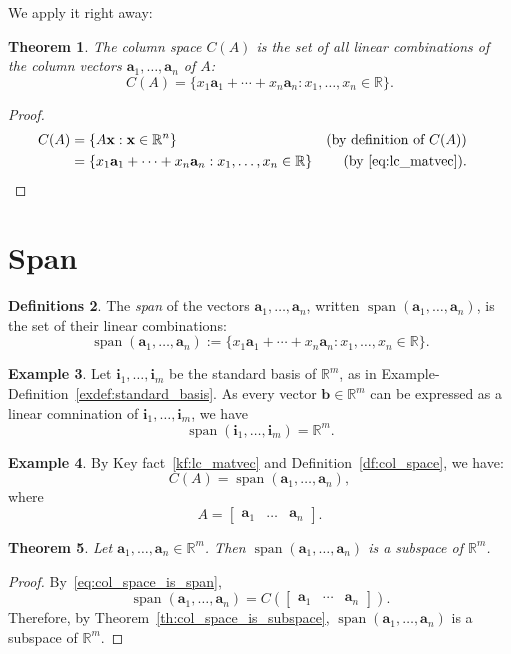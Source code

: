 \documentclass[12pt]{amsart}
\newcommand{\RR}{\mathbb{R}}
\DeclareMathOperator{\Span}{span}
\newtheorem{theorem}{Theorem}[section]
\theoremstyle{definition} \newtheorem{definition}[theorem]{Definition}
\newtheorem{definitions}[theorem]{Definitions}
\newtheorem{example}[theorem]{Example}
\newcommand{\ba}{\mathbf{a}}
\newcommand{\bb}{\mathbf{b}}
\newcommand{\bi}{\mathbf{i}}
\newcommand{\bx}{\mathbf{x}}
\newcommand{\bas}{\ba_1,\ldots,\ba_n}
\newcommand{\mat}[1]{\begin{bmatrix}#1\end{bmatrix}}
\newcommand{\spn}[1]{\Span\left(#1\right)}
\begin{document}
We apply it right away:
\begin{theorem}\label{th:col_space_is_set_of_lcs}
  The column space $C(A)$ is the set of all linear combinations of the column vectors $\bas$ of $A$:
  \[
    C(A) = \{x_1\ba_1+\cdots+x_n\ba_n : x_1,\ldots,x_n\in\RR\}.
  \]
\end{theorem}
\begin{proof}
  \begin{align*}
    C(A) &= \{A\bx : \bx\in \RR^n\}& \text{(by definition of $C(A)$)}\\
         &= \{x_1\ba_1 + \cdots + x_n\ba_n : x_1,\ldots,x_n\in \RR\} &\text{(by~\eqref{eq:lc_matvec})}.&\qedhere
  \end{align*}
\end{proof}

\section{Span}

\begin{definitions}\label{df:span}
  The \emph{span} of the vectors $\bas$, written $\spn{\bas}$, is the set of their linear combinations:
  \[ 
    \spn{\bas} := \{x_1\ba_1+\cdots + x_n\ba_n
    : x_1,\ldots,x_n\in\RR\}.
  \]
\end{definitions}

\begin{example}
  Let $\bi_1,\ldots,\bi_m$ be the standard basis of $\RR^m$, as in Example-Definition~\ref{exdef:standard_basis}. As every vector $\bb\in\RR^m$ can be expressed as a linear comnination of $\bi_1,\ldots,\bi_m$, we have
  \[
    \spn{\bi_1,\ldots,\bi_m} = \RR^m.
  \]
\end{example}

\begin{example}
  By Key fact~\ref{kf:lc_matvec} and Definition~\ref{df:col_space}, we have:
  \begin{equation}\label{eq:col_space_is_span}
    C(A) =\spn{\bas},
  \end{equation}
  where
  \[
    A=\mat{\ba_1&\ldots&\ba_n}.
  \]
\end{example}

\begin{theorem}\label{th:span_is_subspace}
  Let $\bas\in\RR^m$. Then $\spn{\bas}$ is a subspace of $\RR^m$.
\end{theorem}
\begin{proof}
  By~\eqref{eq:col_space_is_span},
  \[
     \spn{\bas}=C\left(\mat{\ba_1&\cdots&\ba_n}\right).
  \]
  Therefore, by Theorem~\ref{th:col_space_is_subspace}, $\spn{\bas}$ is a subspace of $\RR^m$.
\end{proof}
\end{document}
